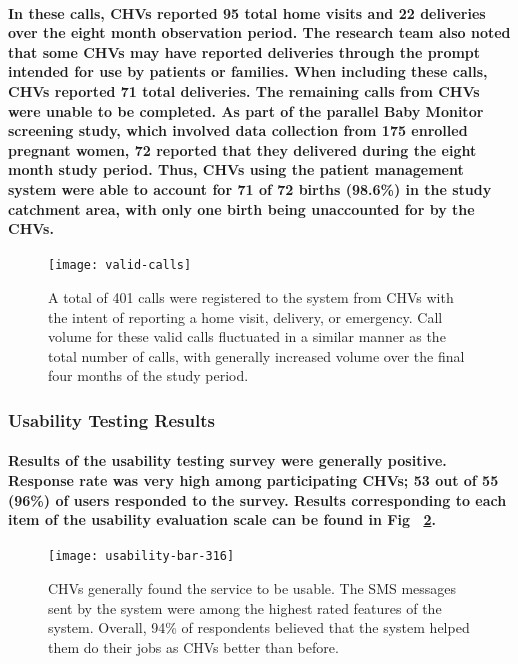 \paragraph{In these calls, CHVs reported 95 total home visits and 22 deliveries over the eight month observation period. The research team also noted that some CHVs may have reported deliveries through the prompt intended for use by patients or families. When including these calls, CHVs reported 71 total deliveries. The remaining calls from CHVs were unable to be completed. As part of the parallel Baby Monitor screening study, which involved data collection from 175 enrolled pregnant women, 72 reported that they delivered during the eight month study period. Thus, CHVs using the patient management system were able to account for 71 of 72 births (98.6\%) in the study catchment area, with only one birth being unaccounted for by the CHVs.}

\begin{figure}[h]
	\begin{center}
	\texttt{[image: valid-calls]}
	\end{center}
	\caption[Valid CHV Calls]{A total of 401 calls were registered to the system from CHVs with the intent of reporting a home visit, delivery, or emergency. Call volume for these valid calls fluctuated in a similar manner as the total number of calls, with generally increased volume over the final four months of the study period.}
	\label{fig:validCHVcalls}
\end{figure}

\subsubsection{Usability Testing Results}
\paragraph{Results of the usability testing survey were generally positive. Response rate was very high among participating CHVs; 53 out of 55 (96\%) of users responded to the survey. Results corresponding to each item of the usability evaluation scale can be found in Fig ~\ref{fig:barchart}.} 

\begin{figure}[h]
	\begin{center}
	\texttt{[image: usability-bar-316]}
	\end{center}
	\caption[Usability survey results]{CHVs generally found the service to be usable. The SMS messages sent by the system were among the highest rated features of the system. Overall, 94\% of respondents believed that the system helped them do their jobs as CHVs better than before.}
	\label{fig:barchart}
\end{figure}

